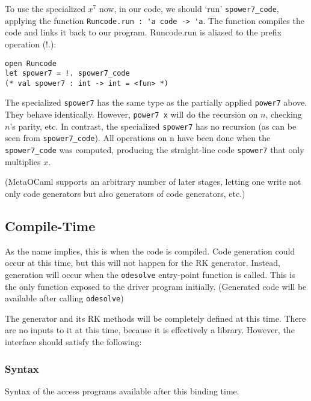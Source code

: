 \documentclass[12pt, titlepage]{article}
\begin{document}
To use the specialized $x^7$ now, in our code, we should `run' 
\lstinline|spower7_code|, applying the function 
\lstinline|Runcode.run : 'a code -> 'a|. The function compiles the code and 
links it back to our program. Runcode.run is aliased to the prefix operation 
(!.):
\begin{lstlisting}
open Runcode
let spower7 = !. spower7_code
(* val spower7 : int -> int = <fun> *)
\end{lstlisting}

The specialized \lstinline|spower7| has the same type as the partially applied 
\lstinline|power7| above. They behave identically. However, 
\lstinline|power7 x| will do the recursion on $n$, checking $n$'s parity, etc. 
In contrast, the specialized \lstinline|spower7| has no recursion (as can be 
seen from \lstinline|spower7_code|). All operations on n have been done when 
the \lstinline|spower7_code| was computed, producing the straight-line code 
\lstinline|spower7| that only multiplies $x$.

(MetaOCaml supports an arbitrary number of later stages, letting one write not 
only code generators but also generators of code generators, etc.)


\subsection{Compile-Time}\label{ssec:compile-time}
As the name implies, this is when the code is compiled. Code generation could 
occur at this time, but this will not happen for the RK generator. Instead, 
generation will occur when the \lstinline[language=ML]|odesolve| entry-point 
function is called. 
This is the only function exposed to the driver program initially. (Generated 
code will be available after calling \lstinline[language=ML]|odesolve|)

The generator and its RK methods will be completely defined at this time. There 
are no inputs to it at this time, because it is effectively a library. However, 
the interface should satisfy the following:

\subsubsection{Syntax}
Syntax of the access programs available after this binding time.
\end{document}
